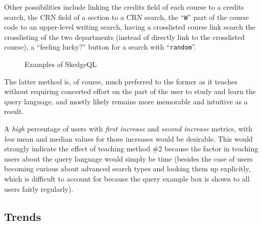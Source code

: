 {\begin{enumerate}
{  Other possibilities include linking the credits field of each course to a credits search, the CRN field of a section to a CRN search, the ``{\tt W}'' part of the course code to an upper-level writing search, having a crosslisted course link search the crosslisting of the two departments (instead of directly link to the crosslisted course), a ``feeling lucky?'' button for a search with ``{\tt random}''.}
\end{enumerate}

\begin{figure}[H]
  \centering
  \caption{Examples of SkedgeQL} \label{fig:sk-search2}
\end{figure}

\noindent The latter method is, of course, much preferred to the former as it teaches without requiring concerted effort on the part of the user to study and learn the query language, and mostly likely remains more memorable and intuitive as a result.

A \emph{high} percentage of users with \emph{first increase} and \emph{second increase} metrics, with \emph{low} mean and median values for those increases would be desirable. This would strongly indicate the effect of teaching method \#2 because the factor in teaching users about the query language would simply be time (besides the case of users becoming curious about advanced search types and looking them up explicitly, which is difficult to account for because the query example box is shown to all users fairly regularly).

\subsection{Trends}

\begin{figure}
  \centering
  \vspace{-10pt}


\end{figure}}
